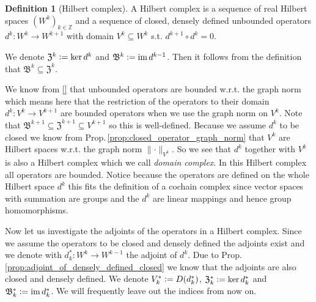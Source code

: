 \documentclass[12pt,a4paper]{article}
\numberwithin{equation}{subsection}
\numberwithin{lemma}{subsection}
\theoremstyle{definition}
\newtheorem{definition}[lemma]{Definition}
\DeclareMathOperator{\Ima}{im}
\newcommand{\integers}{\mathbb{Z}}
\begin{document}
\begin{definition}[Hilbert complex]
    A Hilbert complex is a sequence of real Hilbert spaces $(W^k)_{k\in \integers}$
    and a sequence of closed, densely defined 
    unbounded operators $d^k: W^k \rightarrow W^{k+1}$ with domain
    $V^k \subseteq W^k$ s.t. $d^{k+1} \circ d^k = 0$.
\end{definition}
\noindent We denote $\mathfrak{Z}^k  \vcentcolon= \ker d^k$ and $\mathfrak{B}^k 
\vcentcolon= \Ima d^{k-1}$. Then it follows from the definition that
$\mathfrak{B}^k \subseteq \mathfrak{Z}^k$.

We know from \ref{} that unbounded operators are bounded w.r.t. the graph norm
which means here that the restriction of the operators to their domain 
$d^k: V^k \rightarrow V^{k+1}$ are bounded operators when we use the graph norm
on $V^k$. Note that $\mathfrak{B}^{k+1} \subseteq \mathfrak{Z}^{k+1} 
\subseteq V^{k+1}$
so this is well-defined. Because we assume $d^k$ to be 
closed we know from Prop.\,\ref{prop:closed_operator_graph_norm}
that $V^k$ are Hilbert spaces w.r.t. the graph norm $\lVert \cdot \rVert _{V^k}$.
So we see that $d^k$ together with $V^k$ is also a Hilbert complex which 
we call \textit{domain complex}. In this Hilbert complex all operators are 
bounded. Notice because the operators are defined on the whole Hilbert space 
$d^k$ this fits the definition of a cochain complex since vector spaces 
with summation
are groups and the $d^k$ are linear mappings and hence group homomorphisms.

Now let us investigate the adjoints of the operators in a Hilbert complex.
Since we assume the operators to be closed and densely defined the adjoints 
exist and we denote with $d_k^*:W^k \rightarrow W^{k-1}$ the adjoint of $d^k$.
Due to Prop.\,\ref{prop:adjoint_of_densely_defined_closed} we know that the 
adjoints are also closed and densely defined. We denote 
$V_k^* \vcentcolon= D(d_k^*)$, $\mathfrak{Z}^*_k \vcentcolon= \ker d^*_k$ 
and $\mathfrak{B}^*_k \vcentcolon= \Ima d^*_k$. We will frequently leave out 
the indices from now on.
\end{document}
